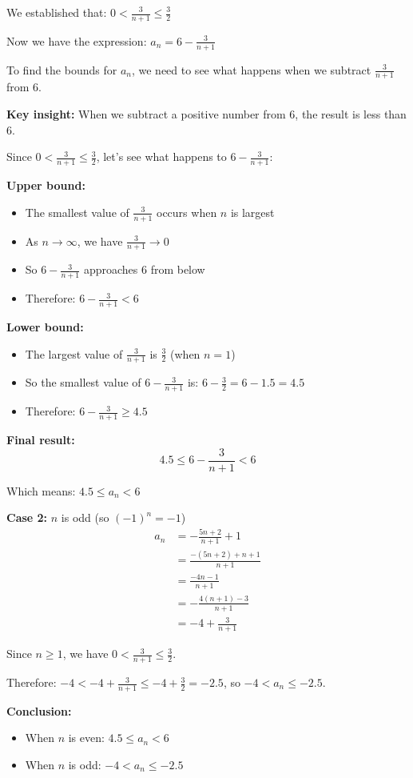 \documentclass[12pt,a4paper]{article}
\theoremstyle{definition}
\theoremstyle{remark}
\begin{document}
We established that: $0 < \frac{3}{n+1} \leq \frac{3}{2}$

Now we have the expression: $a_n = 6 - \frac{3}{n+1}$

To find the bounds for $a_n$, we need to see what happens when we subtract $\frac{3}{n+1}$ from $6$.

\textbf{Key insight:} When we subtract a positive number from $6$, the result is less than $6$.

Since $0 < \frac{3}{n+1} \leq \frac{3}{2}$, let's see what happens to $6 - \frac{3}{n+1}$:

\textbf{Upper bound:}
\begin{itemize}
\item The smallest value of $\frac{3}{n+1}$ occurs when $n$ is largest
\item As $n \to \infty$, we have $\frac{3}{n+1} \to 0$
\item So $6 - \frac{3}{n+1}$ approaches $6$ from below
\item Therefore: $6 - \frac{3}{n+1} < 6$
\end{itemize}

\textbf{Lower bound:}
\begin{itemize}
\item The largest value of $\frac{3}{n+1}$ is $\frac{3}{2}$ (when $n = 1$)
\item So the smallest value of $6 - \frac{3}{n+1}$ is: $6 - \frac{3}{2} = 6 - 1.5 = 4.5$
\item Therefore: $6 - \frac{3}{n+1} \geq 4.5$
\end{itemize}

\textbf{Final result:}
$$4.5 \leq 6 - \frac{3}{n+1} < 6$$

Which means: $4.5 \leq a_n < 6$

\textbf{Case 2:} $n$ is odd (so $(-1)^n = -1$)
\begin{align}
a_n &= -\frac{5n + 2}{n+1} + 1\\
&= \frac{-(5n + 2) + n + 1}{n+1}\\
&= \frac{-4n - 1}{n+1}\\
&= -\frac{4(n+1) - 3}{n+1}\\
&= -4 + \frac{3}{n+1}
\end{align}

Since $n \geq 1$, we have $0 < \frac{3}{n+1} \leq \frac{3}{2}$.

Therefore: $-4 < -4 + \frac{3}{n+1} \leq -4 + \frac{3}{2} = -2.5$, so $-4 < a_n \leq -2.5$.

\textbf{Conclusion:}
\begin{itemize}
\item When $n$ is even: $4.5 \leq a_n < 6$
\item When $n$ is odd: $-4 < a_n \leq -2.5$
\end{itemize}
\end{document}
